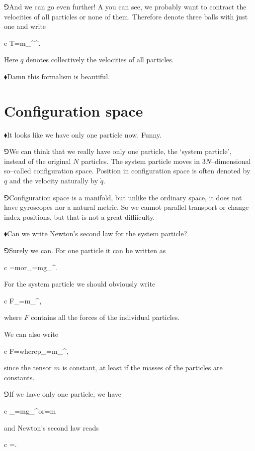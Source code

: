 \documentclass[11pt,oneside%
]{memoir}
\newenvironment{eqna}{\begin{IEEEeqnarray*}{c}}{\end{IEEEeqnarray*}\ignorespacesafterend}
\newcommand{\puoli}{\frac{1}{2}}
\newcommand{\orr}{\qquad\textrm{or}\qquad}
\newcommand{\wheree}{\qquad\textrm{where}\qquad}
\renewcommand{\vec}[1]{\mathbf{#1}}
\newcommand{\dvec}[1]{\dot{\vec{#1}}}
\newcommand{\hea}{\(\blacklozenge\)\;}
\newcommand{\heb}{\(\Game\)\;}
\newcommand{\coa}{{\color{black}\bullet}}
\newcommand{\cob}{{\color{oranssi}\bullet}}
\begin{document}
\heb And we can go even further! A you can see, we probably want to contract the velocities of all particles or none of them. Therefore denote three balls with just one and write
\begin{eqna}
    T=\puoli m_{\coa\cob}^\coa{}^\cob.
\end{eqna}
Here \(\dot{q}\) denotes collectively the velocities of all particles.

\hea Damn this formalism is beautiful.
\section{Configuration space}
\hea It looks like we have only one particle now. Funny.

\heb We can think that we really have only one particle, the `system particle', instead of the original \(N\) particles. The system particle moves in \(3N\)--dimensional so--called configuration space. Position in configuration space is often denoted by \(q\) and the velocity naturally by \(\dot{q}\).

\heb Configuration space is a manifold, but unlike the ordinary space, it does not have gyroscopes nor a natural metric. So we cannot parallel transport or change index positions, but that is not a great diffiiculty.

\hea Can we write Newton's second law for the system particle?

\heb Surely we can. For one particle it can be written as
\begin{eqna}
    \vec{F}=m\ddot{\vec{x}}\orr\vec{F}_\coa=mg_{\coa\cob}\ddot{\vec{x}}^\cob.
\end{eqna}
For the system particle we should obviously write
\begin{eqna}
    F_\coa=m_{\coa\cob}^\cob,
\end{eqna}
where \(F\) contains all the forces of the individual particles.

We can also write
\begin{eqna}
    F=\wheree p_\coa=m_{\coa\cob}^\cob,
\end{eqna}
since the tensor \(m\) is constant, at least if the masses of the particles are constants.

\heb If we have only one particle, we have
\begin{eqna}
    \vec{p}_\coa=mg_{\coa\cob}\dvec{x}^\cob\orr\vec{p}=m\dvec{x}
\end{eqna}
and Newton's second law reads
\begin{eqna}
    \vec{F}=\dvec{p}.
\end{eqna}
\end{document}

